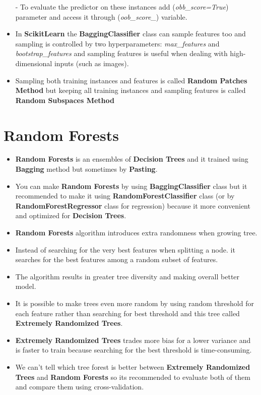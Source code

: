 \documentclass{article}
\begin{document}
\begin{itemize}
    	- To evaluate the predictor on these instances add (\textit{obb\_score=True}) parameter and access it through (\textit{oob\_score\_}) variable.
    	\item In \textbf{Scikit\textendash Learn} the \textbf{BaggingClassifier} class can sample features too and sampling is controlled by two hyperparameters: \textit{max\_features} and \textit{bootstrap\_features} and sampling features is useful when dealing with high-dimensional inputs (such as images).
    	\item Sampling both training instances and features is called \textbf{Random Patches Method} but keeping all training instances and sampling features is called \textbf{Random Subspaces Method}
    	
    \end{itemize}
    \section{Random Forests} 
    \begin{itemize}
		\item \textbf{Random Forests} is an ensembles of \textbf{Decision Trees} and it trained using \textbf{Bagging} method but sometimes by \textbf{Pasting}.
		\item You can make \textbf{Random Forests} by using \textbf{BaggingClassifier} class but it recommended to make it using \textbf{RandomForestClassifier} class (or by \textbf{RandomForestRegressor} class for regression) because it more convenient and optimized for \textbf{Decision Trees}.  
		\item \textbf{Random Forests} algorithm introduces extra randomness  when growing tree.
		\item Instead of searching for the very best features when splitting a node. it searches for the best features among a random subset of features. 
		\item The algorithm results in greater tree diversity and making overall better model.
		\item It is possible to make trees even more random by using random threshold for each feature rather than searching for best threshold and this tree called \textbf{Extremely Randomized Trees}.
		\item \textbf{Extremely Randomized Trees} trades more bias for a lower variance and is faster to train because searching for the best threshold is time-consuming. 
		\item We can't tell which tree forest is better between  \textbf{Extremely Randomized Trees} and \textbf{Random Forests} so its recommended to evaluate both of them and compare them using cross-validation.  
		
    \end{itemize}
\end{document}
